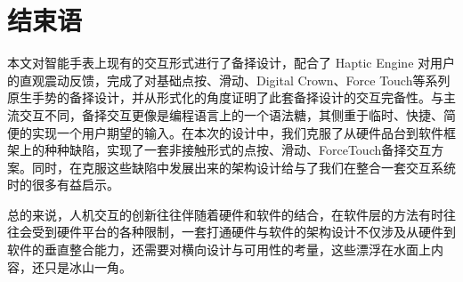 \section{结束语}

本文对智能手表上现有的交互形式进行了备择设计，配合了 Haptic Engine 对用户的直观震动反馈，完成了对基础点按、滑动、Digital Crown、Force Touch等系列原生手势的备择设计，并从形式化的角度证明了此套备择设计的交互完备性。与主流交互不同，备择交互更像是编程语言上的一个语法糖，其侧重于临时、快捷、简便的实现一个用户期望的输入。在本次的设计中，我们克服了从硬件品台到软件框架上的种种缺陷，实现了一套非接触形式的点按、滑动、ForceTouch备择交互方案。同时，在克服这些缺陷中发展出来的架构设计给与了我们在整合一套交互系统时的很多有益启示。

总的来说，人机交互的创新往往伴随着硬件和软件的结合，在软件层的方法有时往往会受到硬件平台的各种限制，一套打通硬件与软件的架构设计不仅涉及从硬件到软件的垂直整合能力，还需要对横向设计与可用性的考量，这些漂浮在水面上内容，还只是冰山一角。
